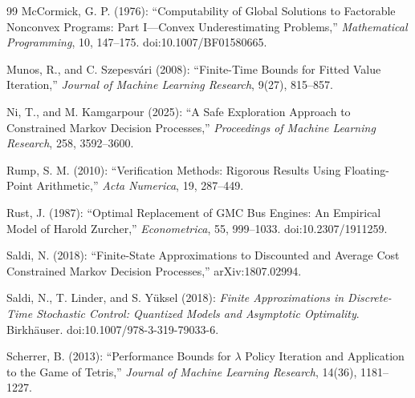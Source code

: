 \begin{thebibliography}{99}
McCormick, G. P. (1976): ``Computability of Global Solutions to Factorable Nonconvex Programs: Part I---Convex Underestimating Problems,'' \emph{Mathematical Programming}, 10, 147--175. doi:10.1007/BF01580665.

Munos, R., and C. Szepesv\'ari (2008): ``Finite-Time Bounds for Fitted Value Iteration,'' \emph{Journal of Machine Learning Research}, 9(27), 815--857.

Ni, T., and M. Kamgarpour (2025): ``A Safe Exploration Approach to Constrained Markov Decision Processes,'' \emph{Proceedings of Machine Learning Research}, 258, 3592--3600.

Rump, S. M. (2010): ``Verification Methods: Rigorous Results Using Floating-Point Arithmetic,'' \emph{Acta Numerica}, 19, 287--449.

Rust, J. (1987): ``Optimal Replacement of GMC Bus Engines: An Empirical Model of Harold Zurcher,'' \emph{Econometrica}, 55, 999--1033. doi:10.2307/1911259.

Saldi, N. (2018): ``Finite-State Approximations to Discounted and Average Cost Constrained Markov Decision Processes,'' arXiv:1807.02994.

Saldi, N., T. Linder, and S. Y\"uksel (2018): \emph{Finite Approximations in Discrete-Time Stochastic Control: Quantized Models and Asymptotic Optimality}. Birkh\"auser. doi:10.1007/978-3-319-79033-6.

Scherrer, B. (2013): ``Performance Bounds for $\lambda$ Policy Iteration and Application to the Game of Tetris,'' \emph{Journal of Machine Learning Research}, 14(36), 1181--1227.

\end{thebibliography}
